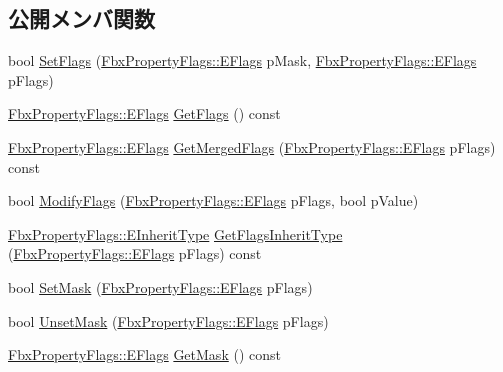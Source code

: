 \subsection*{公開メンバ関数}
\begin{DoxyCompactItemize}
\item 
bool \hyperlink{class_fbx_property_flags_ab5187f4e4f41cb15b59fed3f114036d8}{Set\+Flags} (\hyperlink{class_fbx_property_flags_afabfa7e0949aac8a7dcdf8a141867e99}{Fbx\+Property\+Flags\+::\+E\+Flags} p\+Mask, \hyperlink{class_fbx_property_flags_afabfa7e0949aac8a7dcdf8a141867e99}{Fbx\+Property\+Flags\+::\+E\+Flags} p\+Flags)
\item 
\hyperlink{class_fbx_property_flags_afabfa7e0949aac8a7dcdf8a141867e99}{Fbx\+Property\+Flags\+::\+E\+Flags} \hyperlink{class_fbx_property_flags_aefc4769c28655bc2217756785bc83918}{Get\+Flags} () const
\item 
\hyperlink{class_fbx_property_flags_afabfa7e0949aac8a7dcdf8a141867e99}{Fbx\+Property\+Flags\+::\+E\+Flags} \hyperlink{class_fbx_property_flags_a20c4549ffb1167d35ba85a7d096b322c}{Get\+Merged\+Flags} (\hyperlink{class_fbx_property_flags_afabfa7e0949aac8a7dcdf8a141867e99}{Fbx\+Property\+Flags\+::\+E\+Flags} p\+Flags) const
\item 
bool \hyperlink{class_fbx_property_flags_a639336bbcff51b3a39768be85f030fab}{Modify\+Flags} (\hyperlink{class_fbx_property_flags_afabfa7e0949aac8a7dcdf8a141867e99}{Fbx\+Property\+Flags\+::\+E\+Flags} p\+Flags, bool p\+Value)
\item 
\hyperlink{class_fbx_property_flags_ae3b667a4fcac4b827fa186a698fec2f8}{Fbx\+Property\+Flags\+::\+E\+Inherit\+Type} \hyperlink{class_fbx_property_flags_a8cdb0c6b3dfb7986ce17eed144025e5a}{Get\+Flags\+Inherit\+Type} (\hyperlink{class_fbx_property_flags_afabfa7e0949aac8a7dcdf8a141867e99}{Fbx\+Property\+Flags\+::\+E\+Flags} p\+Flags) const
\item 
bool \hyperlink{class_fbx_property_flags_a527b20839865439acfb1ea9e24a67a2e}{Set\+Mask} (\hyperlink{class_fbx_property_flags_afabfa7e0949aac8a7dcdf8a141867e99}{Fbx\+Property\+Flags\+::\+E\+Flags} p\+Flags)
\item 
bool \hyperlink{class_fbx_property_flags_a06121ae3c3792fc4db8f7f749ca15ff1}{Unset\+Mask} (\hyperlink{class_fbx_property_flags_afabfa7e0949aac8a7dcdf8a141867e99}{Fbx\+Property\+Flags\+::\+E\+Flags} p\+Flags)
\item 
\hyperlink{class_fbx_property_flags_afabfa7e0949aac8a7dcdf8a141867e99}{Fbx\+Property\+Flags\+::\+E\+Flags} \hyperlink{class_fbx_property_flags_a041432d0cdbc9a1fd7c1b9b720cbf816}{Get\+Mask} () const

\end{DoxyCompactItemize}
